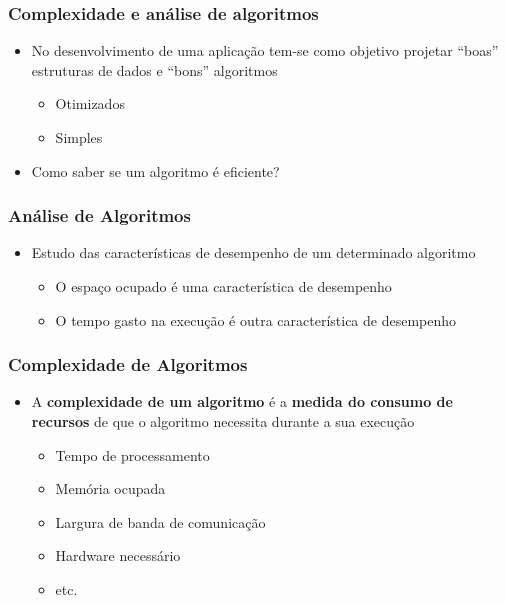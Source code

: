 \documentclass[aspectratio=169]{beamer}
\begin{document}
\begin{frame}\frametitle{Complexidade e análise de algoritmos}
\begin{itemize}
	\item  No desenvolvimento de uma aplicação tem-se como objetivo projetar ``boas'' estruturas de dados e ``bons'' algoritmos
	\begin{itemize}
		\item Otimizados
		\item Simples
	\end{itemize}
	\item Como saber se um algoritmo é eficiente?
\end{itemize}
\end{frame}

\begin{frame}\frametitle{Análise de Algoritmos}
\begin{itemize}
	\item Estudo das características de desempenho de um determinado algoritmo
	\begin{itemize}
		\item O espaço ocupado é uma característica de desempenho
		\item O tempo gasto na execução é outra característica de desempenho
	\end{itemize}
\end{itemize}
\end{frame}

\begin{frame}\frametitle{Complexidade de Algoritmos}
\begin{itemize}
	\item A \textbf{complexidade de um algoritmo} é a \textbf{medida do consumo de recursos} de que o algoritmo necessita durante a sua execução
	\begin{itemize}
		\item Tempo de processamento
		\item Memória ocupada
		\item Largura de banda de comunicação
		\item Hardware necessário
		\item etc.
	\end{itemize}
\end{itemize}
\end{frame}
\end{document}
